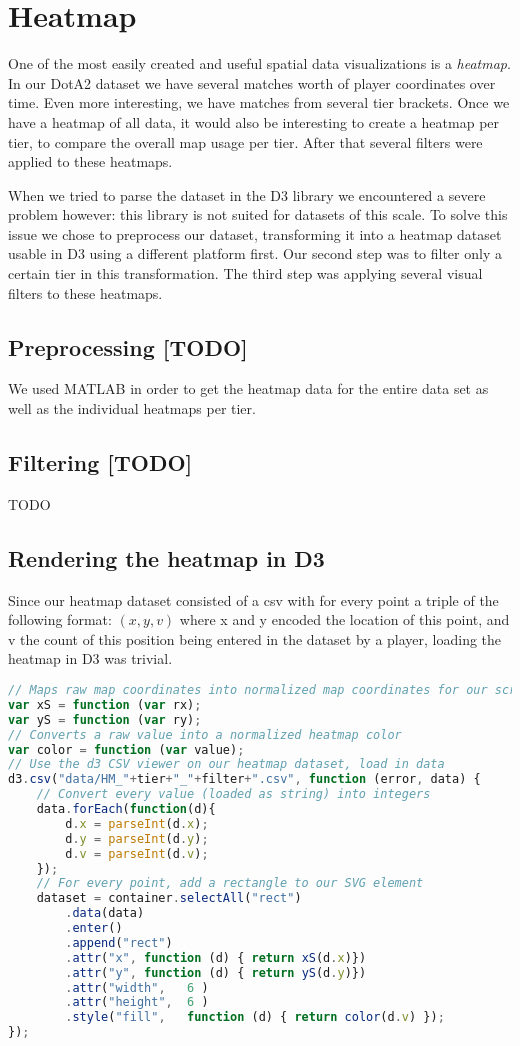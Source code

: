 \section{Heatmap}
One of the most easily created and useful spatial data visualizations is a \emph{heatmap}. In our DotA2 dataset we have several matches worth of player coordinates over time. Even more interesting, we have matches from several tier brackets. Once we have a heatmap of all data, it would also be interesting to create a heatmap per tier, to compare the overall map usage per tier. After that several filters were applied to these heatmaps.

When we tried to parse the dataset in the D3 library we encountered a severe problem however: this library is not suited for datasets of this scale. To solve this issue we chose to preprocess our dataset, transforming it into a heatmap dataset usable in D3 using a different platform first. Our second step was to filter only a certain tier in this transformation. The third step was applying several visual filters to these heatmaps.

\subsection{Preprocessing [TODO]}
We used MATLAB in order to get the heatmap data for the entire data set as well as the individual heatmaps per tier.


\subsection{Filtering [TODO]}
TODO

\subsection{Rendering the heatmap in D3}
Since our heatmap dataset consisted of a csv with for every point a triple of the following format: $(x, y, v)$ where x and y encoded the location of this point, and v the count of this position being entered in the dataset by a player, loading the heatmap in D3 was trivial.

\begin{lstlisting}[language=JavaScript]
// Maps raw map coordinates into normalized map coordinates for our screen
var xS = function (var rx);
var yS = function (var ry);
// Converts a raw value into a normalized heatmap color
var color = function (var value);
// Use the d3 CSV viewer on our heatmap dataset, load in data
d3.csv("data/HM_"+tier+"_"+filter+".csv", function (error, data) {
	// Convert every value (loaded as string) into integers
	data.forEach(function(d){
	    d.x = parseInt(d.x);
	    d.y = parseInt(d.y);
	    d.v = parseInt(d.v);
	});
	// For every point, add a rectangle to our SVG element
	dataset = container.selectAll("rect")
	    .data(data)
	    .enter()
	    .append("rect")
	    .attr("x", function (d) { return xS(d.x)})
	    .attr("y", function (d) { return yS(d.y)})
	    .attr("width",   6 ) 
	    .attr("height",  6 )
	    .style("fill",   function (d) { return color(d.v) });
});
\end{lstlisting}